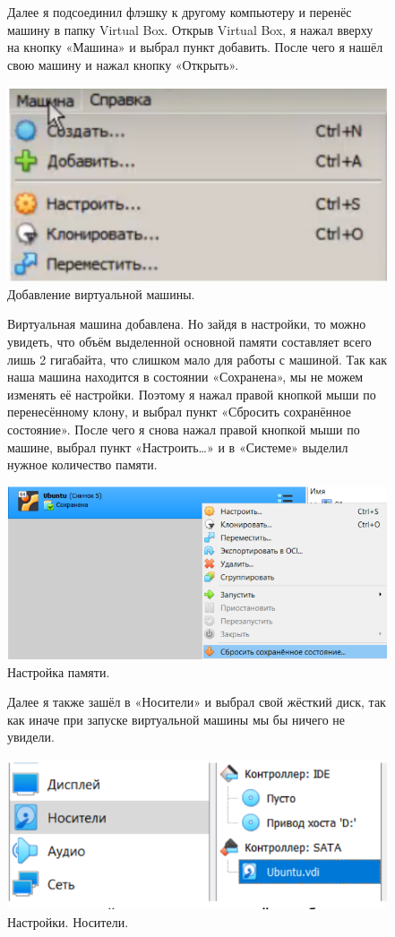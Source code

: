 \begin{figure}
\quad Далее я подсоединил флэшку к другому компьютеру и перенёс машину в папку Virtual Box. Открыв Virtual Box, я нажал вверху на кнопку «Машина» и выбрал пункт добавить. После чего я нашёл свою машину и нажал кнопку «Открыть».

		\centering
		\includegraphics[width=0.4\linewidth]{img/9.png}
\caption{Добавление виртуальной машины.}
\label{ris:image}
\end{figure}

\begin{figure}
\quad Виртуальная машина добавлена. Но зайдя в настройки, то можно увидеть, что объём выделенной основной памяти составляет всего лишь 2 гигабайта, что слишком мало для работы с машиной. Так как наша машина находится в состоянии «Сохранена», мы не можем изменять её настройки. Поэтому я нажал правой кнопкой мыши по перенесённому клону, и выбрал пункт «Сбросить сохранённое состояние». После чего я снова нажал правой кнопкой мыши по машине, выбрал пункт «Настроить…» и в «Системе» выделил нужное количество памяти.

		\centering
		\includegraphics[width=0.65\linewidth]{img/10.png}
\caption{Настройка памяти.}
\label{ris:image}
\end{figure}

\begin{figure}
\quad Далее я также зашёл в «Носители» и выбрал свой жёсткий диск, так как иначе при запуске виртуальной машины мы бы ничего не увидели.

		\centering
		\includegraphics[width=0.65\linewidth]{img/11.png}
\caption{Настройки. Носители.}
\label{ris:image}

\end{figure}

